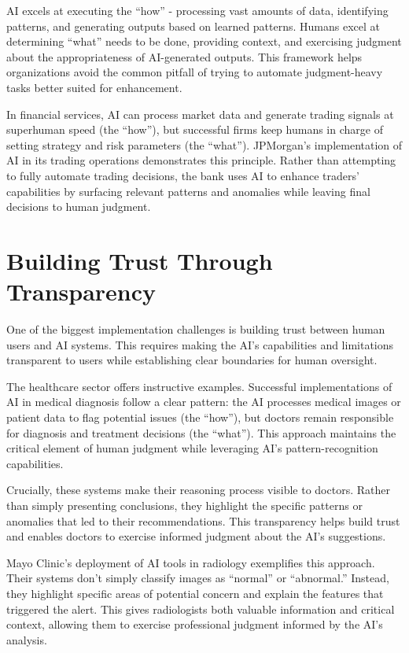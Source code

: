 \documentclass[
  Letterpaper,
]{scrbook}
\begin{document}
AI excels at executing the ``how'' - processing vast amounts of data,
identifying patterns, and generating outputs based on learned patterns.
Humans excel at determining ``what'' needs to be done, providing
context, and exercising judgment about the appropriateness of
AI-generated outputs. This framework helps organizations avoid the
common pitfall of trying to automate judgment-heavy tasks better suited
for enhancement.

In financial services, AI can process market data and generate trading
signals at superhuman speed (the ``how''), but successful firms keep
humans in charge of setting strategy and risk parameters (the ``what'').
JPMorgan's implementation of AI in its trading operations demonstrates
this principle. Rather than attempting to fully automate trading
decisions, the bank uses AI to enhance traders' capabilities by
surfacing relevant patterns and anomalies while leaving final decisions
to human judgment.

\section{Building Trust Through
Transparency}\label{building-trust-through-transparency}

One of the biggest implementation challenges is building trust between
human users and AI systems. This requires making the AI's capabilities
and limitations transparent to users while establishing clear boundaries
for human oversight.

The healthcare sector offers instructive examples. Successful
implementations of AI in medical diagnosis follow a clear pattern: the
AI processes medical images or patient data to flag potential issues
(the ``how''), but doctors remain responsible for diagnosis and
treatment decisions (the ``what''). This approach maintains the critical
element of human judgment while leveraging AI's pattern-recognition
capabilities.

Crucially, these systems make their reasoning process visible to
doctors. Rather than simply presenting conclusions, they highlight the
specific patterns or anomalies that led to their recommendations. This
transparency helps build trust and enables doctors to exercise informed
judgment about the AI's suggestions.

Mayo Clinic's deployment of AI tools in radiology exemplifies this
approach. Their systems don't simply classify images as ``normal'' or
``abnormal.'' Instead, they highlight specific areas of potential
concern and explain the features that triggered the alert. This gives
radiologists both valuable information and critical context, allowing
them to exercise professional judgment informed by the AI's analysis.
\end{document}
